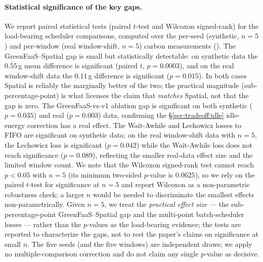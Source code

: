 \paragraph{Statistical significance of the key gaps.}
We report paired statistical tests (paired $t$-test and Wilcoxon
signed-rank) for the load-bearing scheduler comparisons, computed
over the per-seed (synthetic, $n=5$) and per-window (real
window-shift, $n=5$) carbon measurements
(). The GreenFaaS--Spatial gap is small
but statistically detectable: on synthetic data the $0.55$\,g mean
difference is significant (paired $t$, $p=0.0003$), and on the real
window-shift data the $0.11$\,g difference is significant
($p=0.015$). In both cases Spatial is reliably the marginally better
of the two; the practical magnitude (sub-percentage-point) is what
licenses the claim that \GreenFaaS{} \emph{matches} Spatial, not that
the gap is zero. The GreenFaaS-vs-v1 ablation gap is significant on
both synthetic ($p=0.035$) and real ($p=0.003$) data, confirming the
\S\ref{sec:tradeoff:idle} idle-energy correction has a real effect.
The Wait-Awhile and Lechowicz losses to FIFO are significant on
synthetic data; on the real window-shift data with $n=5$, the
Lechowicz loss is significant ($p=0.042$) while the Wait-Awhile loss
does not reach significance ($p=0.089$), reflecting the smaller
real-data effect size and the limited window count. We note that the
Wilcoxon signed-rank test cannot reach $p<0.05$ with $n=5$ (its
minimum two-sided $p$-value is $0.0625$), so we rely on the paired
$t$-test for significance at $n=5$ and report Wilcoxon as a
non-parametric robustness check; a larger $n$ would be needed to
discriminate the smallest effects non-parametrically. Given $n=5$, we
treat the \emph{practical effect size} --- the sub-percentage-point
GreenFaaS--Spatial gap and the multi-point batch-scheduler losses ---
rather than the $p$-values as the load-bearing evidence; the tests are
reported to characterize the gaps, not to rest the paper's claims on
significance at small $n$. The five seeds (and the five windows) are
independent draws; we apply no multiple-comparison correction and do
not claim any single $p$-value as decisive.











